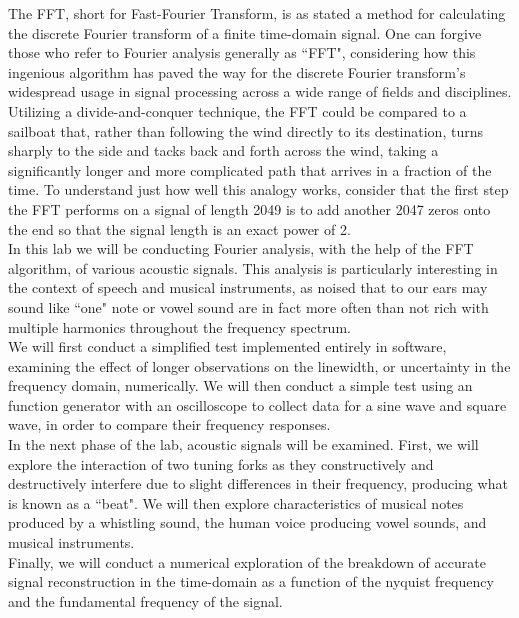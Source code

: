 \documentclass[aps,prl,reprint]{revtex4-2}
\begin{document}
The FFT, short for Fast-Fourier Transform, is as stated a method for
calculating the discrete Fourier transform of a finite time-domain signal.
One can forgive those who refer to Fourier analysis generally as ``FFT", 
considering how this ingenious algorithm has paved the way for
the discrete Fourier transform's widespread usage in signal processing
across a wide range of fields and disciplines. \\

Utilizing a divide-and-conquer technique, the FFT could be compared to 
a sailboat that, rather than following the wind directly to its destination,
turns sharply to the side and tacks back and forth across the wind,
taking a significantly longer and more complicated path that arrives in 
a fraction of the time. To understand just how well this analogy works,
consider that the first step the FFT performs on a signal of length 2049
is to add another 2047 zeros onto the end so that the signal length is 
an exact power of 2. \\

In this lab we will be conducting Fourier analysis, with the help of the 
FFT algorithm, of various acoustic signals. This analysis is particularly
interesting in the context of speech and musical instruments, as noised that
to our ears may sound like ``one" note or vowel sound are in fact more
often than not rich with multiple harmonics throughout the frequency spectrum.\\

We will first conduct a simplified test implemented entirely in software,
examining the effect of longer observations on the linewidth, or uncertainty
in the frequency domain, numerically. We will then conduct a simple test
using an function generator with an oscilloscope to collect data for a 
sine wave and square wave, in order to compare their frequency responses. \\

In the next phase of the lab, acoustic signals will be examined. 
First, we will explore the interaction of two tuning forks as they 
constructively and destructively interfere due to slight differences 
in their frequency, producing what is known as a ``beat". We will then
explore characteristics of musical notes produced by a whistling sound, 
the human voice producing vowel sounds, and musical instruments. \\

Finally, we will conduct a numerical exploration of the breakdown of accurate
signal reconstruction in the time-domain as a function of the nyquist
frequency and the fundamental frequency of the signal. 
\end{document}
